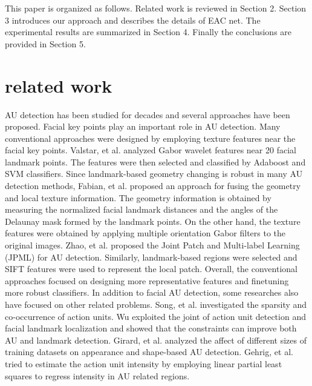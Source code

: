 \documentclass[a4paper, 10pt, conference]{ieeeconf}      %
\begin{document}
This paper is organized as follows. Related work is reviewed in Section 2. Section 3 introduces our approach and describes the details of EAC net. The experimental results are summarized in Section 4. Finally the conclusions are provided in Section 5.


\section{related work}

AU detection has been studied for decades and several approaches have been proposed. Facial key points play an important role in AU detection. Many conventional approaches \cite{p10, p11, p14,  p16, p17, p18, p24, p30} were designed by employing texture features near the facial key points. Valstar, et al. \cite{p9} analyzed Gabor wavelet features near 20 facial landmark points. The features were then selected and classified by Adaboost and SVM classifiers. Since landmark-based geometry changing is robust in many AU detection methods, Fabian, et al. \cite{p12} proposed an approach for fusing the geometry and local texture information. The geometry information is obtained by measuring the normalized facial landmark distances and the angles of the Delaunay mask formed by the landmark points. On the other hand, the texture features were obtained by applying multiple orientation Gabor filters to the original images. Zhao, et al. \cite{p13} proposed the Joint Patch and Multi-label Learning (JPML) for AU detection. Similarly, landmark-based regions were selected and SIFT features were used to represent the local patch. Overall, the conventional approaches focused on designing more representative features and finetuning more robust classifiers.  
In addition to facial AU detection, some researches also have focused on other related problems. Song, et al. \cite{p23} investigated the sparsity and co-occurrence of action units. Wu \cite{p19} exploited the joint of action unit detection and facial landmark localization and showed that the constraints can improve both AU and landmark detection. Girard, et al. \cite{p20} analyzed the affect of different sizes of training datasets on appearance and shape-based AU detection. Gehrig, et al. \cite{p21} tried to estimate the action unit intensity by employing linear partial least squares to regress intensity in AU related regions. 	
\end{document}
